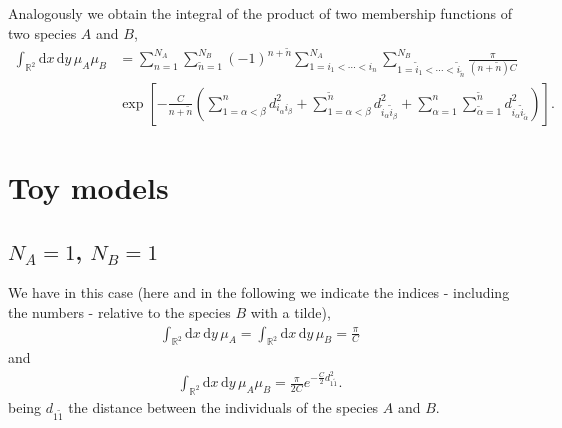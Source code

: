 \documentclass[12pt]{article}
\newcommand{\xd}{\mathrm{d}}
\numberwithin{equation}{section} %
\numberwithin{figure}{section} %
\theoremstyle{definition}
\begin{document}
Analogously we obtain the integral of the product of two membership functions of two species $A$ and $B$,
\begin{align}
\int_{{\mathbb R}^2} \xd x \, \xd y \, \mu_A \mu_B &=  \sum_{n=1}^{N_A} \sum_{\tilde{n}=1}^{N_B} (-1)^{n+\tilde{n}} \sum_{ 1=i_1< \cdots <i_n }^{N_A} \sum_{ 1=\tilde{i}_1< \cdots <\tilde{i}_{\tilde{n}} }^{N_B} \frac{\pi}{(n+\tilde{n})C}
 \nonumber\\
& \exp \left[ - \frac{C}{n+\tilde{n}} \left( \sum_{1=\alpha < \beta}^n d_{i_{\alpha} i_{\beta}}^2 + \sum_{1=\alpha < \beta}^{\tilde{n}} d_{\tilde{i}_{\alpha} \tilde{i}_{\beta}}^2 +
\sum_{\alpha=1}^n \sum_{\tilde{\alpha}=1}^{\tilde{n}} 
d_{i_{\alpha} \tilde{i}_{\tilde{\alpha}}}^2
\right) \right].
\end{align}

\section{Toy models}
\subsection{\texorpdfstring{$N_A=1$}{NA=1}, \texorpdfstring{$N_B=1$}{NB=1}}
We have in this case (here and in the following we indicate the indices - including the numbers - relative to the species $B$ with a tilde),
\begin{align}
\int_{{\mathbb R}^2} \xd x \, \xd y \, \mu_A = \int_{{\mathbb R}^2} \xd x \, \xd y \, \mu_B =  \frac{\pi}{C}
\end{align}
and
\begin{align}
\int_{{\mathbb R}^2} \xd x \, \xd y \, \mu_A \mu_B =  \frac{\pi}{2C} e^{- \frac{C}{2}d^2_{1\tilde{1}}}.
\end{align}
being $d_{1\tilde{1}}$ the distance between the individuals of the species $A$ and $B$.
\end{document}
